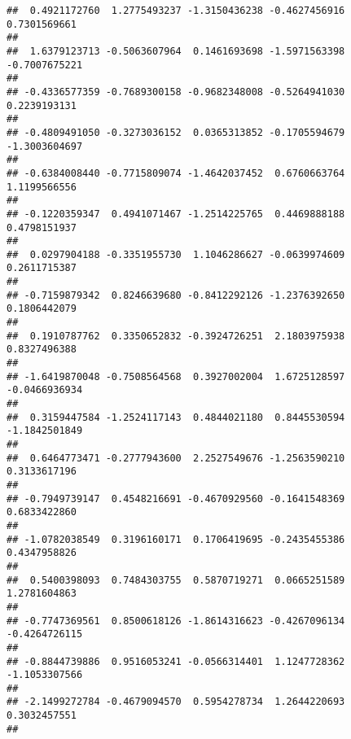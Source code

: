 \documentclass[]{article}
\begin{document}
\begin{verbatim}
##  0.4921172760  1.2775493237 -1.3150436238 -0.4627456916  0.7301569661 
##                                                                       
##  1.6379123713 -0.5063607964  0.1461693698 -1.5971563398 -0.7007675221 
##                                                                       
## -0.4336577359 -0.7689300158 -0.9682348008 -0.5264941030  0.2239193131 
##                                                                       
## -0.4809491050 -0.3273036152  0.0365313852 -0.1705594679 -1.3003604697 
##                                                                       
## -0.6384008440 -0.7715809074 -1.4642037452  0.6760663764  1.1199566556 
##                                                                       
## -0.1220359347  0.4941071467 -1.2514225765  0.4469888188  0.4798151937 
##                                                                       
##  0.0297904188 -0.3351955730  1.1046286627 -0.0639974609  0.2611715387 
##                                                                       
## -0.7159879342  0.8246639680 -0.8412292126 -1.2376392650  0.1806442079 
##                                                                       
##  0.1910787762  0.3350652832 -0.3924726251  2.1803975938  0.8327496388 
##                                                                       
## -1.6419870048 -0.7508564568  0.3927002004  1.6725128597 -0.0466936934 
##                                                                       
##  0.3159447584 -1.2524117143  0.4844021180  0.8445530594 -1.1842501849 
##                                                                       
##  0.6464773471 -0.2777943600  2.2527549676 -1.2563590210  0.3133617196 
##                                                                       
## -0.7949739147  0.4548216691 -0.4670929560 -0.1641548369  0.6833422860 
##                                                                       
## -1.0782038549  0.3196160171  0.1706419695 -0.2435455386  0.4347958826 
##                                                                       
##  0.5400398093  0.7484303755  0.5870719271  0.0665251589  1.2781604863 
##                                                                       
## -0.7747369561  0.8500618126 -1.8614316623 -0.4267096134 -0.4264726115 
##                                                                       
## -0.8844739886  0.9516053241 -0.0566314401  1.1247728362 -1.1053307566 
##                                                                       
## -2.1499272784 -0.4679094570  0.5954278734  1.2644220693  0.3032457551 
##                                                                       

\end{verbatim}
\end{document}
